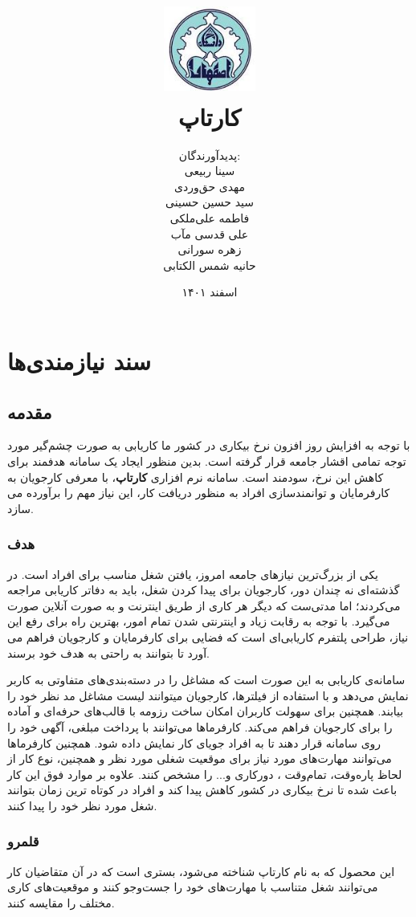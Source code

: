 \documentclass[12pt]{book}
\title{
	\includegraphics[width=3cm, height=3cm]{logo.jpeg} \\ \vspace{2cm}
	{\Huge کارتاپ}
}
\author{
	پدید‌آورندگان: \\
	سینا ربیعی \\
	مهدی حق‌وردی \\
	سید حسین حسینی \\
	فاطمه علی‌ملکی \\
	علی قدسی مآب \\
	زهره سورانی \\
	حانیه شمس الکتابی
	
}
\date{اسفند ۱۴۰۱}
\begin{document}
	\renewcommand{\bibname}{مراجع}
	\maketitle
	\tableofcontents
	
	\chapter{سند نیازمندی‌ها}
	\section{مقدمه} 
	با توجه به افزایش روز افزون نرخ بیکاری در کشور ما کاریابی به صورت چشم‌گیر مورد توجه تمامی اقشار جامعه قرار گرفته است. بدین منظور ایجاد یک سامانه هدفمند برای کاهش این نرخ، سودمند است. سامانه نرم افزاری \textbf{کارتاپ}، با معرفی کارجویان به کارفرمایان و توانمندسازی افراد به منظور دریافت کار، این نیاز مهم را برآورده می سازد.
	\subsection{هدف}
	یکی از بزرگ‌ترین نیازهای جامعه امروز، یافتن شغل مناسب برای افراد است. در گذشته‌ای نه چندان دور، کارجویان برای پیدا کردن شغل، باید به دفاتر کاریابی مراجعه می‌کردند؛ اما مدتی‌ست که دیگر هر کاری از طریق اینترنت و به صورت آنلاین صورت می‌گیرد. با توجه به رقابت زیاد و اینترنتی شدن تمام امور، بهترین راه برای رفع این نیاز، طراحی پلتفرم کاریابی‌‌ای است که فضایی برای کارفرمایان و کارجویان فراهم می آورد تا بتوانند به راحتی به هدف خود برسند.
	
	سامانه‌ی کاریابی به این صورت است که مشاغل را در دسته‌بندی‌های متفاوتی به کاربر نمایش می‌دهد و با استفاده از فیلترها، کارجویان میتوانند لیست مشاغل مد نظر خود را بیابند. همچنین برای سهولت کاربران امکان ساخت رزومه با قالب‌های حرفه‌ای و آماده را برای کارجویان فراهم می‌کند. کارفرما‌ها می‌توانند با پرداخت مبلغی، آگهی خود را روی سامانه قرار دهند تا به افراد جویای کار نمایش داده شود. همچنین کارفرماها می‌توانند مهارت‌های مورد نیاز برای موقعیت شغلی مورد نظر و همچنین، نوع کار از لحاظ پاره‌وقت، تمام‌وقت ، دورکاری و... را مشخص کنند.
	علاوه بر موارد فوق این کار باعث شده تا نرخ بیکاری در کشور کاهش پیدا کند و افراد در کوتاه ترین زمان بتوانند شغل مورد نظر خود را پیدا کنند.
	
	\subsection{قلمرو} 
	این محصول که به نام کارتاپ شناخته می‌شود، بستری است که در آن متقاضیان کار می‌توانند شغل متناسب با مهارت‌های خود را جست‌وجو کنند و موقعیت‌های کاری مختلف را مقایسه کنند.
	
\end{document}
